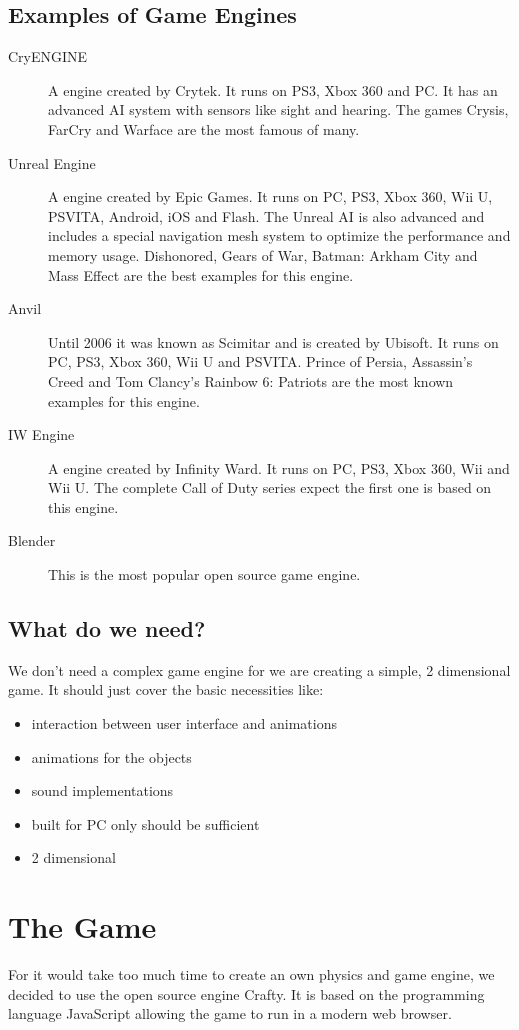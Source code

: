 \subsection{Examples of Game Engines}
\begin{description}
  \item[CryENGINE] A engine created by Crytek. It runs on PS3, Xbox 360 and PC. It has an advanced AI system with sensors like sight and hearing. The games Crysis, FarCry and Warface are the most famous of many.
  \item[Unreal Engine] A engine created by Epic Games. It runs on PC, PS3, Xbox 360, Wii U, PSVITA, Android, iOS and Flash. The Unreal AI is also advanced and includes a special navigation mesh system to optimize the performance and memory usage. Dishonored, Gears of War, Batman: Arkham City and Mass Effect are the best examples for this engine.
  \item[Anvil] Until 2006 it was known as Scimitar and is created by Ubisoft. It runs on PC, PS3, Xbox 360, Wii U and PSVITA. Prince of Persia, Assassin's Creed and Tom Clancy's Rainbow 6: Patriots are the most known examples for this engine.
  \item[IW Engine] A engine created by Infinity Ward. It runs on PC, PS3, Xbox 360, Wii and Wii U. The complete Call of Duty series expect the first one is based on this engine.
  \item[Blender] This is the most popular open source game engine. 
\end{description}

\subsection{What do we need?}
We don't need a complex game engine for we are creating a simple, 2 dimensional game. It should just cover the basic necessities like:
\begin{itemize}
  \item interaction between user interface and animations
  \item animations for the objects
  \item sound implementations
  \item built for PC only should be sufficient
  \item 2 dimensional
\end{itemize}
\newpage

\section{The Game}
For it would take too much time to create an own physics and game engine, we decided to use the open source engine Crafty. It is based on the programming language JavaScript allowing the game to run in a modern web browser.

